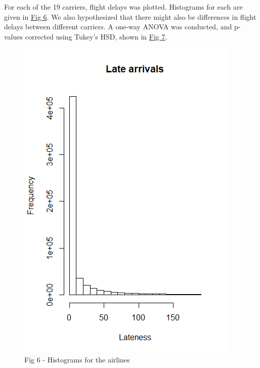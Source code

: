 \documentclass[12pt, a4paper]{book}
\newcommand\tab[1][1cm]{\hspace*{#1}}
\begin{document}
			\tab For each of the 19 carriers, flight delays was plotted. Histograms for each are given in \underline{Fig 6}. We also hypothesized that there might also be differences in flight delays between different carriers. A one-way ANOVA was conducted, and p-values corrected using Tukey's HSD, shown in \underline{Fig 7}.
			\begin{figure}[h]
	 		\includegraphics[width = 1 \textwidth]{../figures/LateArrivalsHistogram}
	 		\caption{Fig 6 - Histograms for the airlines}
	 		\end{figure}
\end{document}

